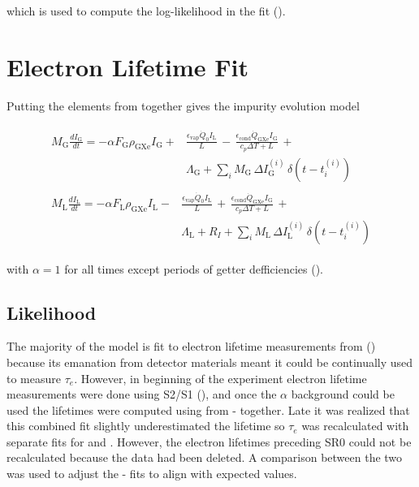\noindent which is used to compute the log-likelihood in the fit ().



\section{Electron Lifetime Fit}
\label{sec:elifetime_fit}
Putting the elements from  together gives the impurity evolution model

\begin{subequations}
\begin{align}
\begin{split}
M_{\mathrm{G}} \frac{dI_{\mathrm{G}}}{dt} = - \alpha F_{\mathrm{G}} \rho_{\mathrm{GXe}} I_{\mathrm{G}} +
& \frac{\epsilon_{\mathrm{vap}} \dot{Q}_0 I_{\mathrm{L}}}{L}\, - \,
\frac{\epsilon_{\mathrm{cond}} \dot{Q}_{\mathrm{GXe}} I_{\mathrm{G}}}{c_p \Delta T + L}\, + \\
& \Lambda_{\mathrm{G}} + \sum_i  M_{\mathrm{G}}\, \Delta I_{\mathrm{G}}^{(i)}\, \delta (t - t_i^{(i)})
\end{split}
\\
\begin{split}
M_{\mathrm{L}} \frac{dI_{\mathrm{L}}}{dt} = -\alpha F_{\mathrm{L}} \rho_{\mathrm{GXe}} I_{\mathrm{L}} -
& \frac{\epsilon_{\mathrm{vap}} \dot{Q}_0 I_{\mathrm{L}}}{L}\, + \,
\frac{\epsilon_{\mathrm{cond}} \dot{Q}_{\mathrm{GXe}} I_{\mathrm{G}}}{c_p \Delta T + L}\, + \\
& \Lambda_{\mathrm{L}} + R_I + \sum_i  M_{\mathrm{L}}\, \Delta I_{\mathrm{L}}^{(i)}\, \delta (t - t_i^{(i)})
\end{split}
\end{align}
\end{subequations}

\noindent with $\alpha = 1$ for all times except periods of getter defficiencies
().



\subsection{Likelihood}
\label{subsec:elifetime_fit_likelihood}
The majority of the model is fit to electron lifetime measurements from 
() because its emanation from
detector materials meant it could be continually used to measure $\tau_e$.  However, in beginning of the
experiment electron lifetime measurements were done using S2/S1 (), and once the $\alpha$
background could be used the lifetimes were computed using \alphadecays from - together.  Late it was realized
that this combined
fit slightly underestimated the lifetime so $\tau_e$ was recalculated with separate fits for  and .  However,
the electron lifetimes preceding SR0 could not be recalculated because the data had been deleted.  A comparison between the two was used
to adjust the - fits to align with expected values.

